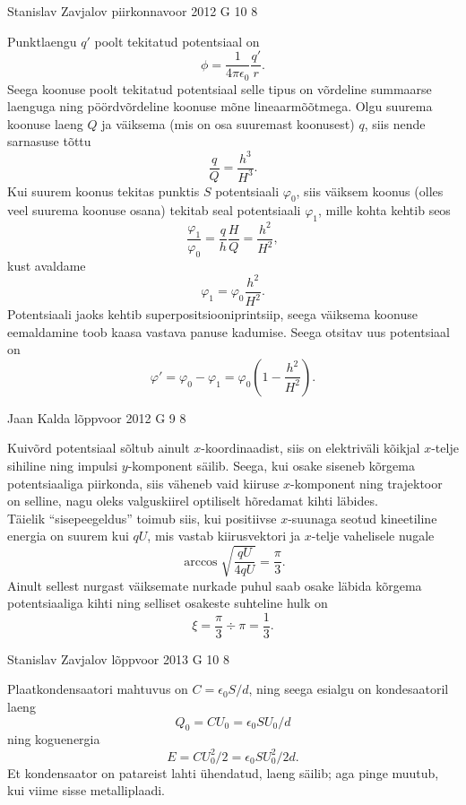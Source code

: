 \documentclass[11pt]{article}
\begin{document}
{%
{Stanislav Zavjalov} %
{piirkonnavoor} %
{2012} %
{G 10} %
{8} %
{

\ifSolution
Punktlaengu $q'$ poolt tekitatud potentsiaal on
\[
\phi = \frac{1}{4 \pi \epsilon_0} \frac{q'}{r}.
\]
Seega koonuse poolt tekitatud potentsiaal selle tipus on võrdeline summaarse laenguga ning pöördvõrdeline koonuse mõne lineaarmõõtmega. Olgu suurema koonuse laeng $Q$ ja väiksema (mis on osa suuremast koonusest) $q$, siis nende sarnasuse tõttu
\[
\frac{q}{Q} = \frac{h^3}{H^3}.
\]
Kui suurem koonus tekitas punktis $S$ potentsiaali $\varphi_0$, siis väiksem koonus (olles veel suurema koonuse osana) tekitab seal potentsiaali $\varphi_1$, mille kohta kehtib seos
\[
\frac{\varphi_1}{\varphi_0} = \frac{q}{h} \frac{H}{Q} = \frac{h^2}{H^2},
\]
kust avaldame
\[
\varphi_1 = \varphi_0 \frac{h^2}{H^2}.
\]
Potentsiaali jaoks kehtib superpositsiooniprintsiip, seega väiksema koonuse eemaldamine toob kaasa vastava panuse kadumise. Seega otsitav uus potentsiaal on
\[
\varphi' = \varphi_0 - \varphi_1 = \varphi_0 \left( 1 - \frac{h^2}{H^2}\right).
\]
\fi
}

{Jaan Kalda} %
{lõppvoor} %
{2012} %
{G 9} %
{8} %
{

\ifSolution
\osa Kuivõrd potentsiaal sõltub ainult $x$-koordinaadist, siis on elektriväli kõikjal $x$-telje sihiline ning
impulsi $y$-komponent säilib. Seega, kui osake siseneb kõrgema potentsiaaliga piirkonda, siis 
väheneb vaid kiiruse $x$-komponent ning
trajektoor on selline, nagu oleks valguskiirel optiliselt hõredamat kihti läbides.\\
\osa Täielik \enquote{sisepeegeldus} toimub siis, kui positiivse $x$-suunaga 
seotud kineetiline energia on suurem kui $qU$, mis vastab kiirusvektori 
ja $x$-telje vahelisele nugale
\[
\arccos \sqrt{\frac {qU}{4qU}}=\frac \pi 3.
\]
Ainult sellest nurgast väiksemate nurkade puhul saab osake läbida kõrgema 
potentsiaaliga kihti ning selliset osakeste suhteline hulk on
\[
\xi = \frac \pi 3 \div \pi = \frac 13.
\]
\fi
}

{Stanislav Zavjalov} %
{lõppvoor} %
{2013} %
{G 10} %
{8} %
{

\ifSolution
Plaatkondensaatori mahtuvus on $C = \epsilon_0 S / d$, ning seega esialgu on kondesaatoril laeng $$Q_0 = C U_0 = \epsilon_0 S U_0/ d$$ ning koguenergia $$E = C U_0^2 / 2 = \epsilon_0 S U_0^2/ 2 d.$$Et kondensaator on patareist lahti ühendatud, laeng säilib; aga pinge muutub, kui viime sisse metalliplaadi.

}}
\end{document}
